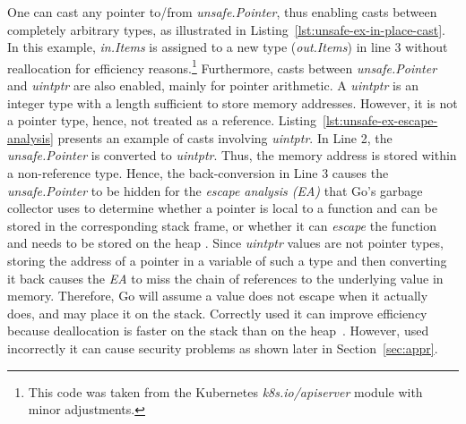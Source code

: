 One can cast any pointer to/from \textit{unsafe.Pointer}, thus enabling casts between completely arbitrary types, as illustrated in  
%
Listing~\ref{lst:unsafe-ex-in-place-cast}.
In this example, \textit{in.Items} is assigned to a new type (\textit{out.Items}) in line 3 without reallocation for efficiency reasons.\footnote{This code was taken from the Kubernetes \textit{k8s.io/apiserver} module with minor adjustments.} 
Furthermore, casts between \textit{unsafe.Pointer} and \textit{uintptr} are also enabled, mainly for pointer arithmetic.
A \textit{uintptr} is an integer type with a length sufficient to store memory addresses. 
However, it is not a pointer type, hence, not treated as a reference.
%
Listing~\ref{lst:unsafe-ex-escape-analysis} presents an example of casts involving \textit{uintptr}. 
In Line 2, the \textit{unsafe.Pointer} is converted to \textit{uintptr}.
Thus, the memory address is stored within a non-reference type.
Hence, the back-conversion in Line 3 causes the \textit{unsafe.Pointer} to be hidden for the \textit{escape analysis (EA)} that Go's garbage collector uses 
to determine whether a pointer is local to a function and can be stored in the corresponding stack frame, 
or whether it can \textit{escape} the function and needs to be stored on the heap \cite{wang2020}. 
Since \textit{uintptr} values are not pointer types, storing the address of a pointer in a variable of such a type and then converting it back causes the \textit{EA} to miss the chain of references to the underlying value in memory. 
Therefore, Go will assume a value does not escape when it actually does, and may place it on the stack.
Correctly used it can improve efficiency because deallocation is faster on the stack than on the heap~\cite{wang2020}.
However, used incorrectly it can cause security problems as shown later in Section~\ref{sec:appr}.

